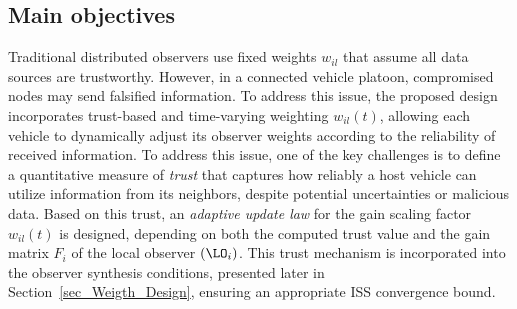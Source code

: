 \subsection{Main objectives}
\vspace*{-0.3cm}
Traditional distributed observers use fixed weights $w_{i l}$ that assume all data sources are trustworthy. However, in a connected vehicle platoon, compromised nodes may send falsified information. To address this issue, the proposed design incorporates trust-based and time-varying weighting $w_{i l}(t)$, allowing each vehicle to dynamically adjust its observer weights according to the reliability of received information. To address this issue, one of the key challenges is to define a quantitative measure of \emph{trust} that captures how reliably a host vehicle can utilize information from its neighbors, despite potential uncertainties or malicious data. Based on this trust, an \emph{adaptive update law} for the gain scaling factor $w_{il}(t)$ is designed, depending on both the computed trust value and the gain matrix $F_i$ of the local observer $(\LO_i)$. This trust mechanism is incorporated into the observer synthesis conditions, presented later in Section~\ref{sec_Weigth_Design}, ensuring an appropriate ISS convergence bound.




